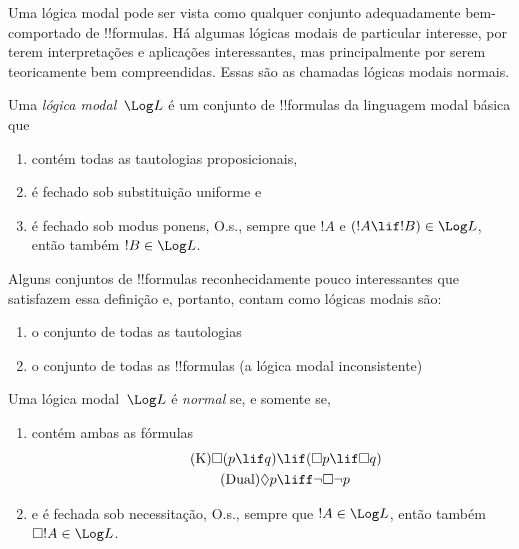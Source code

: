 \documentclass[../../../include/open-logic-section]{subfiles}
\begin{document}


Uma lógica modal pode ser vista como qualquer conjunto adequadamente bem-comportado de
!!{formula}s. Há algumas lógicas modais de particular
interesse, por terem interpretações e
aplicações interessantes, mas principalmente por serem teoricamente bem
compreendidas. Essas são as chamadas lógicas modais normais.

\begin{defn}
Uma \emph{lógica modal}~$\Log L$ é um conjunto de !!{formula}s da linguagem
modal básica que 
\begin{enumerate}
\item contém todas as tautologias proposicionais, 
\item é fechado sob substituição uniforme e 
\item é fechado sob modus ponens, O.s.\@, sempre que $!A$ e $(!A \lif
  !B) \in \Log L$, então também $!B \in \Log L$.
\end{enumerate}
\end{defn}

\begin{ex}
Alguns conjuntos de !!{formula}s reconhecidamente pouco interessantes que
satisfazem essa definição e, portanto, contam como lógicas modais são:
\begin{enumerate}
\item o conjunto de todas as tautologias
\item o conjunto de todas as !!{formula}s (a lógica modal inconsistente)
\end{enumerate}
\end{ex}

\begin{defn}\label{defn:normal-modal-logic}
Uma lógica modal~$\Log L$ é \emph{normal} se, e somente se, 
\begin{enumerate}
\item contém ambas as fórmulas
\begin{align}
\tag{K} \Box(p \lif q) & \lif (\Box p \lif \Box q) \\
\tag{Dual} \Diamond p & \liff \lnot \Box \lnot p
\end{align}
\item e é fechada sob necessitação, O.s.\@, sempre que $!A \in
  \Log L$, então também $\Box !A \in \Log L$.
\end{enumerate}
\end{defn}
\end{document}
